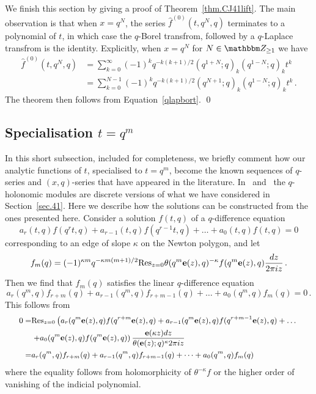 \documentclass[12pt,reqno]{amsart}
\theoremstyle{definition}
\def\BZ{\mathbbm Z}
\def\Res{\mathrm{Res}}
\def\be{\begin{equation}}
\def\ee{\end{equation}}
\def\e{\bold e}
\begin{document}
We finish this section by giving a proof of Theorem~\ref{thm.CJ41lift}. The
main observation is that when $x=q^N$, the series $\hat{f}^{(0)}(t,q^{N},q)$
terminates to a polynomial of $t$, in which case the $q$-Borel transfrom, followed
by a $q$-Laplace transfrom is the identity. Explicitly, when $x=q^{N}$ for
$N\in\BZ_{\geq1}$ we have
  \be
  \begin{aligned}
\hat{f}^{(0)}(t,q^{N},q)
&=
\sum_{k=0}^{\infty}(-1)^{k}q^{-k(k+1)/2}
(q^{1+N};q)_{k}(q^{1-N};q)_{k}t^{k}\\
&=
\sum_{k=0}^{N-1}(-1)^{k}q^{-k(k+1)/2}
(q^{N+1};q)_{k}(q^{1-N};q)_{k}t^{k}\,.
  \end{aligned}
  \ee
  The theorem then follows from Equation~\eqref{qlapbort}.
\qed

\subsection{Specialisation $t=q^m$}
\label{sub.tqm}

In this short subsection, included for completeness, we briefly comment how
our analytic functions of $t$, specialised to $t=q^m$, become the known sequences
of $q$-series and $(x,q)$-series that have appeared in the literature. 
In~\cite{GZ:qseries} and~\cite{GGM:peacock,GGM,GGMW:trivial} the $q$-holonomic
modules are discrete versions of what we have considered in Section~\ref{sec.41}.
Here we describe how the solutions can be constructed from the ones presented here.
Consider a solution $f(t,q)$ of a $q$-difference equation
$$
a_r(t,q) f(q^r t, q) + a_{r-1}(t,q) f(q^{r-1}t,q) + \dots + a_0(t,q) f(t,q) =0 
$$
corresponding to an edge of slope $\kappa$ on the Newton polygon, and let
\be
\label{fm}
f_{m}(q)=(-1)^{\kappa m}q^{-\kappa m(m+1)/2}
\Res_{z=0}\theta(q^{m}\e(z),q)^{-\kappa}f(q^{m}\e(z),q)\frac{dz}{2\pi iz} \,.
\ee
Then we find that $f_m(q)$ satisfies the linear $q$-difference equation
$$
a_r(q^m,q) f_{r+m}(q) + a_{r-1}(q^m,q) f_{r+m-1}(q) + \dots
  + a_0(q^m,q) f_{m}(q) =0 \,.
$$
This follows from   
\be
\begin{small}
\begin{aligned}
  0=&\Res_{z=0}\left(a_r(q^m\e(z),q) f(q^{r+m}\e(z), q)
    + a_{r-1}(q^m\e(z),q) f(q^{r+m-1}\e(z),q) + \dots \right. \\ & \left.
    + a_0(q^m\e(z),q) f(q^m\e(z),q)\right)
  \frac{\e(\kappa z)dz}{\theta(\e(z);q)^{\kappa}2\pi iz}\\
  =&a_r(q^m,q) f_{r+m}(q) + a_{r-1}(q^m,q) f_{r+m-1}(q) + \dots
  + a_0(q^m,q) f_{m}(q) 
\end{aligned}
\end{small}
\ee
where the equality follows from holomorphicity of $\theta^{-\kappa}f$ or the
higher order of vanishing of the indicial polynomial.
\end{document}
